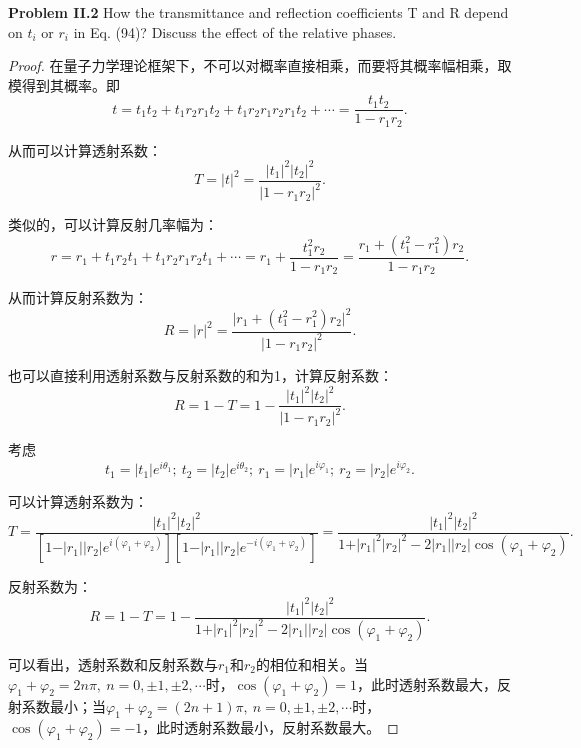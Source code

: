 \documentclass[reqno,a4paper,12pt]{amsart}
\begin{document}
\textbf{Problem II.2} How the transmittance and reflection coefficients T and R depend on $t_i$ or $r_i$ in Eq. (94)? Discuss the effect of the relative phases.

\begin{proof}
在量子力学理论框架下，不可以对概率直接相乘，而要将其概率幅相乘，取模得到其概率。即
\[
	t = t_1t_2 + t_1r_2r_1t_2 + t_1r_2r_1r_2r_1t_2 + \cdots = \frac{t_1t_2}{1-r_1r_2}.
\]

从而可以计算透射系数：
\[
	T = \vert t \vert^2 = \frac{\vert t_1 \vert^2 \vert t_2 \vert^2}{\vert 1 - r_1r_2 \vert^2}.
\]

类似的，可以计算反射几率幅为：
\[
	r = r_1 + t_1r_2t_1 + t_1r_2r_1r_2t_1 + \cdots = r_1 + \frac{t_1^2r_2}{1-r_1r_2} = \frac{r_1+(t_1^2-r_1^2)r_2}{1-r_1r_2}.
\]

从而计算反射系数为：
\[
	R = \vert r \vert^2 = \frac{\vert r_1+(t_1^2-r_1^2)r_2 \vert^2}{\vert 1 - r_1r_2 \vert^2}.
\]

也可以直接利用透射系数与反射系数的和为1，计算反射系数：
\[
	R = 1 - T = 1 - \frac{\vert t_1 \vert^2 \vert t_2 \vert^2}{\vert 1 - r_1r_2 \vert^2}.
\]

考虑
\[
	t_1 = \vert t_1 \vert e^{i\theta_1}; \ t_2 = \vert t_2 \vert e^{i\theta_2}; \ r_1 = \vert r_1 \vert e^{i\varphi_1}; \ r_2 = \vert r_2 \vert e^{i\varphi_2}.
\]

可以计算透射系数为：
\[
	T = \frac{\vert t_1 \vert^2 \vert t_2 \vert^2}{[1 - \vert r_1 \vert \vert r_2 \vert e^{i(\varphi_1+\varphi_2)}][1 - \vert r_1 \vert \vert r_2 \vert e^{-i(\varphi_1+\varphi_2)}]} = \frac{\vert t_1 \vert^2 \vert t_2 \vert^2}{1 + \vert r_1 \vert^2 \vert r_2 \vert^2 - 2\vert r_1 \vert \vert r_2 \vert \cos(\varphi_1+\varphi_2)}.
\]

反射系数为：
\[
	R = 1 - T = 1 - \frac{\vert t_1 \vert^2 \vert t_2 \vert^2}{1 + \vert r_1 \vert^2 \vert r_2 \vert^2 - 2\vert r_1 \vert \vert r_2 \vert \cos(\varphi_1+\varphi_2)}.
\]

可以看出，透射系数和反射系数与$r_1$和$r_2$的相位和相关。当$\varphi_1+\varphi_2 = 2n\pi, \ n=0,\pm1,\pm2,\cdots$时，$\cos(\varphi_1+\varphi_2) = 1$，此时透射系数最大，反射系数最小；当$\varphi_1+\varphi_2 = (2n+1)\pi, \ n=0,\pm1,\pm2,\cdots$时，$\cos(\varphi_1+\varphi_2) = -1$，此时透射系数最小，反射系数最大。
\end{proof}
\end{document}

